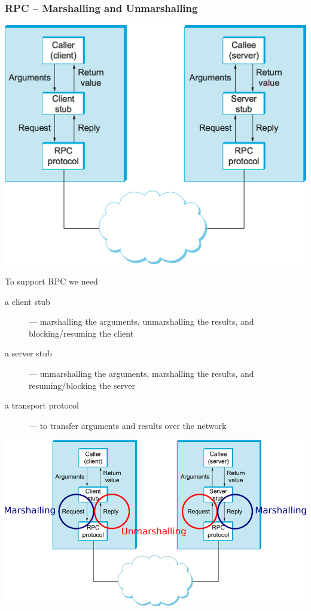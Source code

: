 \documentclass[presentation]{beamer}\mode<presentation>{\usetheme{AMSBolognaFC}}
\begin{document}
\begin{frame}[allowframebreaks]
    \frametitle{RPC -- Marshalling and Unmarshalling}

    \centering

    \includegraphics[width=.7\linewidth]{figures/rpc-2.png}

    \framebreak

    \begin{block}{To support RPC we need}
        \begin{description}
            \item[a client stub] --- marshalling the arguments, unmarshalling the results, and blocking/resuming the client

            \item[a server stub] --- unmarshalling the arguments, marshalling the results, and resuming/blocking the server

            \item[a transport protocol] --- to transfer arguments and results over the network
        \end{description}
    \end{block}

    \framebreak

    \includegraphics[width=\linewidth]{figures/rpc-3.pdf}


\end{frame}
\end{document}
